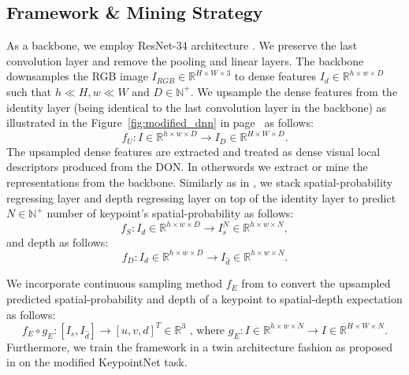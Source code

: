 \subsection{Framework \& Mining Strategy}

As a backbone, we employ ResNet-34 architecture \cite{resnet}.
We preserve the last convolution layer and remove the pooling and linear layers. The backbone downsamples the RGB image $I_{RGB} \in \mathbb{R}^{H \times W \times 3}$
to dense features $I_d \in \mathbb{R}^{h \times w \times D}$
such that $ h \ll H, w \ll W \text{ and } D \in \mathbb{N}^+$.
We upsample the dense features from the identity layer
(being identical to the last convolution layer in the backbone) as illustrated in the Figure~\ref{fig:modified_dnn} in page~\pageref{fig:modified_dnn} as follows:
\begin{equation}
    f_U: I \in \mathbb{R}^{h \times w \times D} \rightarrow I_D \in \mathbb{R}^{H \times W \times D}.
\end{equation}
The upsampled dense features are extracted and treated as dense visual local descriptors produced from the DON. In otherwords
we extract or mine the representations from the backbone.
Similarly as in \cite{suwajanakorn2018discovery}, we stack spatial-probability regressing layer and
depth regressing layer on top of the identity layer to predict $N \in \mathbb{N}^+$ number of keypoint's spatial-probability as follows:
\begin{equation}
    f_S: I_d \in \mathbb{R}^{h \times w \times D} \rightarrow I_s^N \in \mathbb{R}^{h \times w \times N},
\end{equation}
and depth as follows:
\begin{equation}
    f_D: I_d \in \mathbb{R}^{h \times w \times D} \rightarrow I_{\hat{d}} \in \mathbb{R}^{h \times w \times N}.
\end{equation}

We incorporate continuous sampling method $f_E$ from \parencites{florence2020dense}{suwajanakorn2018discovery}
to convert the upsampled predicted spatial-probability and depth of a keypoint to spatial-depth expectation as follows:
\begin{equation}
    f_E \circ g_E:[I_s, I_{\hat{d}}] \rightarrow [u, v, d]^T \in \mathbb{R}^3 \text{ , where }  g_E: I \in \mathbb{R}^{h \times w \times N} \rightarrow I \in \mathbb{R}^{H \times W \times N}.
\end{equation}
Furthermore, we train the framework in a twin architecture fashion as proposed in
\parencites{chen2020simple}{zbontar2021barlow}{florence2018dense}{florence2020dense}{kupcsik2021supervised}{adrian2022efficient}{hadjivelichkov2021fully}{nerf-Supervision}
on the modified KeypointNet task.

